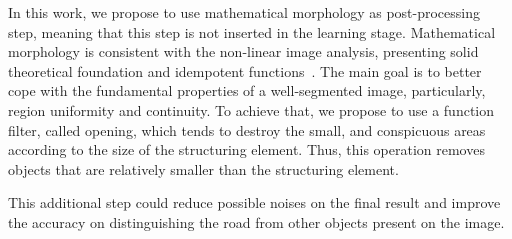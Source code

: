 
In this work, we propose to use mathematical morphology as post-processing step, meaning that this step is not inserted in the learning stage. Mathematical morphology is consistent with the non-linear image analysis, presenting solid theoretical foundation and idempotent functions~\cite{najman13}. The main goal is to better cope with the fundamental properties of a well-segmented image, particularly, region uniformity and continuity. To achieve that, we propose to use a function filter, called opening, which tends to destroy the small, and conspicuous areas according to the size of the structuring element. Thus, this operation removes objects that are relatively smaller than the structuring element.



This additional step could reduce possible noises on the final result and improve the accuracy on distinguishing the road from other objects present on the image.


